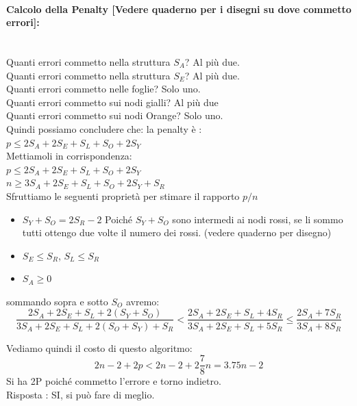\paragraph{Calcolo della Penalty [Vedere quaderno per i disegni su dove commetto
            errori]:}\ \\
Quanti errori commetto nella struttura $S_A$? Al più due.\\
Quanti errori commetto nella struttura $S_E$? Al più due.\\
Quanti errori commetto nelle foglie? Solo uno.\\
Quanti errori commetto sui nodi gialli? Al più due\\
Quanti errori commetto sui nodi Orange? Solo uno.\\
Quindi possiamo concludere che: la penalty è : \\
$p \leq 2 S_A + 2 S_E + S_L + S_O + 2 S_Y$\\
Mettiamoli in corrispondenza: \\
$p \leq 2 S_A + 2 S_E + S_L + S_O + 2 S_Y$\\
$n \geq 3 S_A + 2 S_E + S_L + S_O + 2 S_Y + S_R$\\

Sfruttiamo le seguenti proprietà per stimare il rapporto $p/n$\\
\vspace{-10mm}
\begin{itemize}
    \item $S_Y + S_O = 2 S_R - 2$ Poiché $S_Y + S_O$ sono intermedi ai nodi rossi,
          se li sommo tutti ottengo due volte il numero dei rossi. (vedere quaderno per
          disegno)
    \item $S_E \leq S_R$, $S_L \leq S_R$
    \item $S_A \geq 0$
\end{itemize}
sommando sopra e sotto $S_O$ avremo: \\
$$\frac{2 S_A + 2 S_E + S_L + 2(S_Y + S_O)}{3 S_A + 2 S_E + S_L + 2(S_O + S_Y) +
        S_R} < \frac{2 S_A + 2 S_E + S_L + 4 S_R}{3 S_A + 2 S_E + S_L + 5 S_R} \leq
    \frac{2 S_A + 7 S_R}{3 S_A + 8 S_R} $$

Vediamo quindi il costo di questo algoritmo:\\
$$ 2n - 2 + 2p < 2n -2 + 2 \frac{7}{8} n = 3.75n -2 $$ Si ha 2P poiché commetto
l'errore e torno indietro.\\
Risposta : SI, si può fare di meglio.\\


